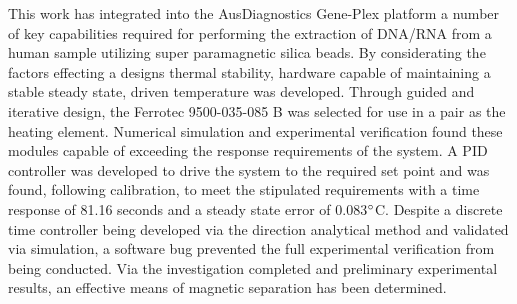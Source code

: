 This work has integrated into the AusDiagnostics Gene-Plex platform a number of key capabilities required for performing the extraction of DNA/RNA from a human sample utilizing super paramagnetic silica beads. By considerating the factors effecting a designs thermal stability, hardware capable of maintaining a stable steady state, driven temperature was developed. Through guided and iterative design, the Ferrotec 9500-035-085 B was selected for use in a pair as the heating element. Numerical simulation and experimental verification found these modules capable of exceeding the response requirements of the system. A PID controller was developed to drive the system to the required set point and was found, following calibration, to meet the stipulated requirements with a time response of 81.16 seconds and a steady state error of 0.083$\degree$C. Despite a discrete time controller being developed via the direction analytical method and validated via simulation, a software bug prevented the full experimental verification from being conducted. Via the investigation completed and preliminary experimental results, an effective means of magnetic separation has been determined.